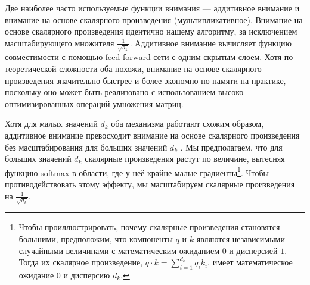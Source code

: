 \documentclass{article}
\begin{document}
Две наиболее часто используемые функции внимания — аддитивное внимание \citep{bahdanau2014neural} и внимание на основе скалярного произведения (мультипликативное). Внимание на основе скалярного произведения идентично нашему алгоритму, за исключением масштабирующего множителя $\frac{1}{\sqrt{d_k}}$. Аддитивное внимание вычисляет функцию совместимости с помощью feed-forward сети с одним скрытым слоем. Хотя по теоретической сложности оба похожи, внимание на основе скалярного произведения значительно быстрее и более экономно по памяти на практике, поскольку оно может быть реализовано с использованием высоко оптимизированных операций умножения матриц. 




Хотя для малых значений $d_k$ оба механизма работают схожим образом, аддитивное внимание превосходит внимание на основе скалярного произведения без масштабирования для больших значений $d_k$ \citep{DBLP:journals/corr/BritzGLL17}. Мы предполагаем, что для больших значений $d_k$ скалярные произведения растут по величине, вытесняя функцию softmax в области, где у неё крайне малые градиенты\footnote{Чтобы проиллюстрировать, почему скалярные произведения становятся большими, предположим, что компоненты $q$ и $k$ являются независимыми случайными величинами с математическим ожиданием $0$ и дисперсией $1$. Тогда их скалярное произведение, $q \cdot k = \sum_{i=1}^{d_k} q_ik_i$, имеет математическое ожидание $0$ и дисперсию $d_k$.}. Чтобы противодействовать этому эффекту, мы масштабируем скалярные произведения на $\frac{1}{\sqrt{d_k}}$.
\end{document}
